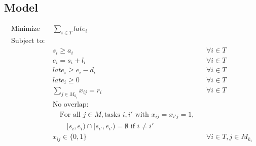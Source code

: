 \documentclass{article}
\begin{document}
\subsection*{Model}
\begin{align*}
\text{Minimize} \quad & \sum_{i \in T} late_i \\
\text{Subject to:} \\
& s_i \geq a_i && \forall i \in T \\
& e_i = s_i + l_i && \forall i \in T \\
& late_i \geq e_i - d_i && \forall i \in T \\
& late_i \geq 0 && \forall i \in T \\
& \sum_{j \in M_{k_i}} x_{ij} = r_i && \forall i \in T \\
& \text{No overlap:} \\
& \quad \text{For all } j \in M, \text{tasks } i, i' \text{ with } x_{ij} = x_{i'j} = 1, \\
& \qquad [s_i, e_i) \cap [s_{i'}, e_{i'}) = \emptyset \text{ if } i \neq i' \\
& x_{ij} \in \{0,1\} && \forall i \in T, j \in M_{k_i}
\end{align*}
\end{document}
